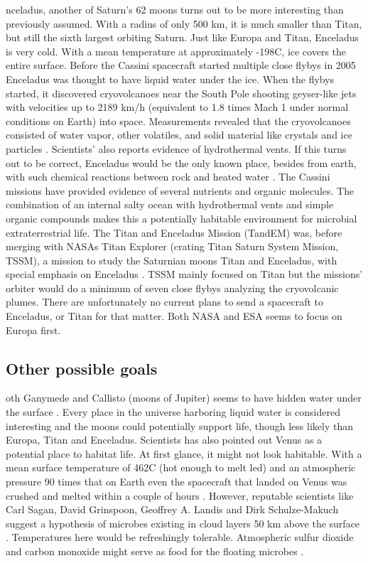 \begin{multicols}{2}

 
nceladus, another of Saturn’s 62 moons turns out to be more interesting than previously assumed.
With a radius of only 500 km, it is much smaller than Titan, but still the sixth largest orbiting Saturn.
Just like Europa and Titan, Enceladus is very cold.
With a mean temperature at approximately -198\degree C, ice covers the entire surface.
Before the Cassini spacecraft started multiple close flybys in 2005 Enceladus was thought to have liquid water under the ice.
When the flybys started, it discovered cryovolcanoes near the South Pole shooting geyser-like jets with velocities up to 2189 km/h (equivalent to 1.8 times Mach 1 under normal conditions on Earth) into space.
Measurements revealed that the cryovolcanoes consisted of water vapor, other volatiles, and solid material like crystals and ice particles \cite{Enceladus1}.
Scientists’ also reports evidence of hydrothermal vents.
If this turns out to be correct, Enceladus would be the only known place, besides from earth, with such chemical reactions between rock and heated water \cite{FPlan09}.
The Cassini missions have provided evidence of several nutrients and organic molecules.
The combination of an internal salty ocean with hydrothermal vents and simple organic compounds makes this a potentially habitable environment for microbial extraterrestrial life.
The Titan and Enceladus Mission (TandEM) was, before merging with NASAs Titan Explorer (crating Titan Saturn System Mission, TSSM), a mission to study the Saturnian moons Titan and Enceladus, with special emphasis on Enceladus \cite{FPlan11}.
TSSM mainly focused on Titan but the missions’ orbiter would do a minimum of seven close flybys analyzing the cryovolcanic plumes.
There are unfortunately no current plans to send a spacecraft to Enceladus, or Titan for that matter.
Both NASA and ESA seems to focus on Europa first.

\subsection{Other possible goals}

oth Ganymede and Callisto (moons of Jupiter) seems to have hidden water under the surface \cite{FPlan09}.
Every place in the universe harboring liquid water is considered interesting and the moons could potentially support life, though less likely than Europa, Titan and Enceladus.
Scientists has also pointed out Venus as a potential place to habitat life.
At first glance, it might not look habitable.
With a mean surface temperature of 462\degree C (hot enough to melt led) and an atmospheric pressure 90 times that on Earth even the spacecraft that landed on Venus was crushed and melted within a couple of hours \cite{FPlan17} \cite{FPlan18}.
However, reputable scientists like Carl Sagan, David Grinspoon, Geoffrey A. Landis and Dirk Schulze-Makuch suggest a hypothesis of microbes existing in cloud layers 50 km above the surface \cite{LifeVenus}.
Temperatures here would be refreshingly tolerable.
Atmospheric sulfur dioxide and carbon monoxide might serve as food for the floating microbes \cite{FPlan20}.


\end{multicols}
